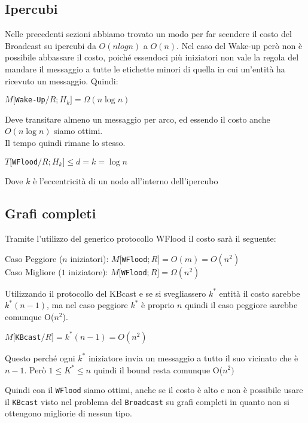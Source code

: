 \subsection{Ipercubi}
Nelle precedenti sezioni abbiamo trovato un modo per far scendere il costo del
Broadcast su ipercubi da $O(nlogn)$ a $O(n)$. Nel caso del Wake-up però non è
possibile abbassare il costo, poiché essendoci più iniziatori non vale la regola
del mandare il messaggio a tutte le etichette minori di quella in cui un'entità
ha ricevuto un messaggio. Quindi:
\begin{center}
    $M[$\texttt{Wake-Up}$/R;H_k] = \Omega(n \log n)$ \\
\end{center}
Deve transitare almeno un messaggio per arco, ed essendo il costo anche $O(n
    \log n)$ siamo ottimi.\\
Il tempo quindi rimane lo stesso.
\begin{center}
    $T[$\texttt{WFlood}$/R;H_k] \leq d = k = \log n$ \\
\end{center}
Dove $k$ è l'eccentricità di un nodo all'interno dell'ipercubo

\subsection{Grafi completi}
Tramite l'utilizzo del generico protocollo WFlood il costo sarà il seguente:

\begin{center}
    Caso Peggiore ($n$ iniziatori): $M[$\texttt{WFlood}$;R] = O(m) = O(n^2)$ \\
    Caso Migliore ($1$ iniziatore): $M[$\texttt{WFlood}$;R] = \Omega(n^2)$
\end{center}
Utilizzando il protocollo del KBcast e se si svegliassero $k^*$ entità il costo
sarebbe $k^*(n-1)$, ma nel caso peggiore $k^*$ è proprio $n$ quindi il caso
peggiore sarebbe comunque O($n^2$).
\begin{center}
    $M[$\texttt{KBcast}$/R] = k^*(n-1) = O(n^2)$
\end{center}
Questo perché ogni $k^*$ iniziatore invia un messaggio a tutto il suo vicinato
che è $n-1$. Però $1\leq K^* \leq n$ quindi il bound resta comunque O($n^2)$

Quindi con il \texttt{WFlood} siamo ottimi, anche se il costo è alto e non è
possibile usare il \texttt{KBcast} visto nel problema del \texttt{Broadcast} su
grafi completi in quanto non si ottengono migliorie di nessun tipo.

